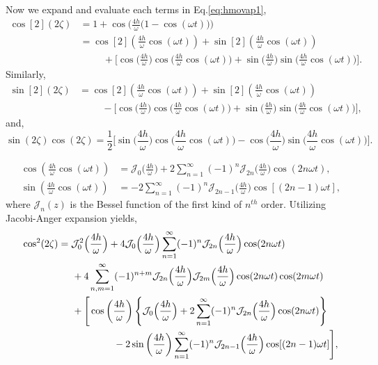 \documentclass[12pt]{iopart}
\begin{document}
\noindent Now we expand and evaluate each terms in Eq.\eqref{eq:hmovap1},
\begin{align}
\cos[2](2\zeta) &= 1 + \cos\Bigg(\frac{4h}{\omega}\big(1-\cos(\omega t)\big)\Bigg)\nonumber\\
&=\cos[2](\frac{4h}{\omega}\cos(\omega t))+ \sin[2](\frac{4h}{\omega}\cos(\omega t))\nonumber\\
&\hspace{1cm}+ \Bigg[\cos\Big(\frac{4h}{\omega}\Big)\cos\Big(\frac{4h}{\omega}\cos(\omega t)\Big) +\sin\Big(\frac{4h}{\omega}\Big)\sin\Big(\frac{4h}{\omega}\cos(\omega t)\Big)\Bigg].
\label{eq:cossqr}
\end{align}
Similarly,
\begin{align}
\sin[2](2\zeta) &=\cos[2](\frac{4h}{\omega}\cos(\omega t))+ \sin[2](\frac{4h}{\omega}\cos(\omega t))\nonumber\\ 
&\hspace{1cm}-\Bigg[\cos\Big(\frac{4h}{\omega}\Big)\cos\Big(\frac{4h}{\omega}\cos(\omega t)\Big) + \sin\Big(\frac{4h}{\omega}\Big)\sin\Big(\frac{4h}{\omega}\cos(\omega t)\Big)\Bigg],
\label{eq:sinsqr}
\end{align}
and,
\begin{equation}
\sin(2\zeta) \cos(2\zeta)=\frac12\Bigg[ \sin\Big(\frac{4h}{\omega}\Big)\cos\Big(\frac{4h}{\omega}\cos(\omega t)\Big) -\cos\Big(\frac{4h}{\omega}\Big)\sin\Big(\frac{4h}{\omega}\cos(\omega t)\Big)\Bigg].
\label{eq:sincos}
\end{equation}

\begin{align*}
\cos(\frac{4h}{\omega}\cos(\omega t)) &= \mathcal{J}_0\Big(\frac{4h}{\omega}\Big) + 2 \sum_{n=1}^\infty (-1)^n \mathcal{J}_{2n}\Big(\frac{4h}{\omega}\Big)\cos(2n\omega t),\\
\sin(\frac{4h}{\omega}\cos(\omega t)) &=-2 \sum_{n=1}^\infty (-1)^n \mathcal{J}_{2n-1}\Big(\frac{4h}{\omega}\Big)\cos[(2n-1)\omega t],
\end{align*}
where $\mathcal{J}_n(z)$ is the Bessel function of the first kind of $n^{th}$ order. Utilizing Jacobi-Anger expansion yields,
\begin{align}
\cos^2(2\zeta)
&= \mathcal{J}^2_0\Big(\frac{4h}{\omega}\Big) + 4\mathcal{J}_0\Big(\frac{4h}{\omega}\Big)\sum_{n=1}^\infty (-1)^n \mathcal{J}_{2n}\Big(\frac{4h}{\omega}\Big)\cos(2n\omega t)\nonumber\\
&\hspace{0.5cm}+4\sum_{n,m=1}^\infty(-1)^{n+m}\mathcal{J}_{2n}\Big(\frac{4h}{\omega}\Big)\mathcal{J}_{2m}\Big(\frac{4h}{\omega}\Big) \cos(2n\omega t)\cos(2m\omega t)\nonumber\\
&\hspace{0.5cm}+\Bigg[\cos\left(\frac{4h}{\omega}\right)\left\{\mathcal{J}_0\Big(\frac{4h}{\omega}\Big) + 2 \sum_{n=1}^\infty (-1)^n \mathcal{J}_{2n}\Big(\frac{4h}{\omega}\Big)\cos(2n\omega t)\right\}\nonumber\\
&\hspace{2.0cm}-2\sin\left(\frac{4h}{\omega}\right) \sum_{n=1}^\infty(-1)^n \mathcal{J}_{2n-1}\Big(\frac{4h}{\omega}\Big)\cos[(2n-1)\omega t]\Bigg],
\label{eq:cossqr2}
\end{align}
\end{document}
